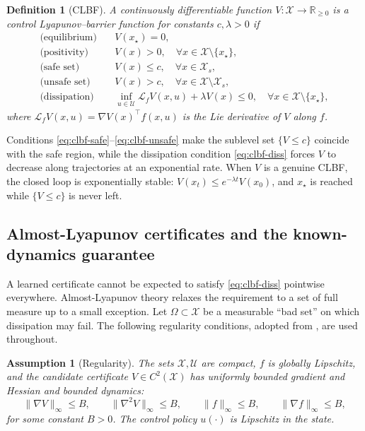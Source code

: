 \documentclass{article}
\newcommand{\R}{\mathbb{R}}
\newcommand{\Xs}{\mathcal{X}_s}
\newcommand{\Lie}[2]{\mathcal{L}_{#1} #2}
\newtheorem{definition}[theorem]{Definition}
\newtheorem{assumption}[theorem]{Assumption}
\begin{document}
\begin{definition}[CLBF]
\label{def:clbf}
A continuously differentiable function $V:\mathcal{X}\to\R_{\ge 0}$ is a control
Lyapunov--barrier function for constants $c,\lambda>0$ if
\begin{align}
\text{(equilibrium)}\quad & V(x_\star)=0, \label{eq:clbf-eq}\\
\text{(positivity)}\quad & V(x)>0, \quad \forall x\in\mathcal{X}\setminus\{x_\star\}, \label{eq:clbf-pos}\\
\text{(safe set)}\quad & V(x)\le c, \quad \forall x\in\Xs, \label{eq:clbf-safe}\\
\text{(unsafe set)}\quad & V(x)>c, \quad \forall x\in\mathcal{X}\setminus\Xs, \label{eq:clbf-unsafe}\\
\text{(dissipation)}\quad & \inf_{u\in\mathcal{U}} \Lie{f}{V}(x,u)+\lambda V(x)\le 0,
    \quad \forall x\in\mathcal{X}\setminus\{x_\star\}, \label{eq:clbf-diss}
\end{align}
where $\Lie{f}{V}(x,u)=\nabla V(x)^\top f(x,u)$ is the Lie derivative of $V$ along
$f$.
\end{definition}

Conditions \eqref{eq:clbf-safe}--\eqref{eq:clbf-unsafe} make the sublevel set
$\{V\le c\}$ coincide with the safe region, while the dissipation condition
\eqref{eq:clbf-diss} forces $V$ to decrease along trajectories at an exponential
rate. When $V$ is a genuine CLBF, the closed loop is exponentially stable:
$V(x_t)\le e^{-\lambda t}V(x_0)$, and $x_\star$ is reached while $\{V\le c\}$ is
never left.

\subsection{Almost-Lyapunov certificates and the known-dynamics guarantee}

A learned certificate cannot be expected to satisfy \eqref{eq:clbf-diss}
pointwise everywhere. Almost-Lyapunov theory relaxes the requirement to a set of
full measure up to a small exception. Let $\Omega\subset\mathcal{X}$ be a
measurable ``bad set'' on which dissipation may fail. The following regularity
conditions, adopted from \citet{cheng2026safe}, are used throughout.

\begin{assumption}[Regularity]
\label{ass:reg}
The sets $\mathcal{X},\mathcal{U}$ are compact, $f$ is globally Lipschitz, and the
candidate certificate $V\in C^2(\mathcal{X})$ has uniformly bounded gradient and
Hessian and bounded dynamics:
\[
    \|\nabla V\|_\infty\le B,\qquad
    \|\nabla^2 V\|_\infty\le B,\qquad
    \|f\|_\infty\le B,\qquad
    \|\nabla f\|_\infty\le B,
\]
for some constant $B>0$. The control policy $u(\cdot)$ is Lipschitz in the state.
\end{assumption}
\end{document}
